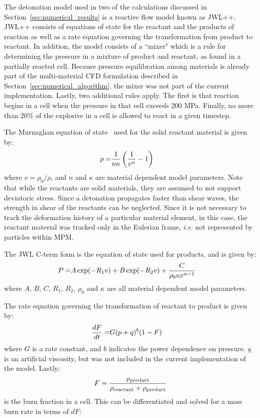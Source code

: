 The detonation model used in two of the calculations discussed in 
Section~\ref{sec:numerical_results} is a reactive flow model known as 
JWL++\cite{JWLpp}.  JWL++ consists of equations of state for the
reactant and the products of reaction as well as a rate equation governing 
the transformation from product to reactant.  In addition, the model consists 
of a ``mixer" which is a rule for determining the pressure in a mixture of 
product and reactant, as found in a partially reacted cell.  Because pressure 
equilibration among materials is already part of the  multi-material CFD 
formulation described in Section~\ref{sec:numerical_algorithm}, the mixer was 
not part of the current implementation.  Lastly, two additional rules 
apply.  The first is that reaction begins in a cell when the pressure in that
cell exceeds 200 MPa.  Finally, no more than 20\% of the explosive in a cell 
is allowed to react in a given timestep.

The Murnaghan equation of state~\cite{Murnaghan1944} used for the solid reactant 
material is given by:
\begin{eqnarray}
p=&{1\over n \kappa}\left({1\over v^n}-1\right)&
\label{Murnaghan}
\end{eqnarray}
where $v=\rho_0/\rho$, and $n$ and $\kappa$ are material dependent model 
parameters.  Note that while the reactants are solid materials, they are 
assumed to not support deviatoric stress.  Since a detonation propagates 
faster than shear waves, the strength in shear of the reactants can be 
neglected.  Since it is not necessary to track the deformation history 
of a particular material element, in this case, the reactant material was 
tracked only in the Eulerian frame, \textit{i.e.} not represented by 
particles within MPM.

The JWL C-term form is the equation of state used for products, and is 
given by:
\begin{eqnarray}
P=&A \exp(-R_1 v) + B \exp(-R_2 v) + {C\over {\rho_0 \kappa v^{n-1}}}&
\label{JWLC}
\end{eqnarray}
where $A$, $B$, $C$, $R_1$, $R_2$, $\rho_0$ and $\kappa$ are all 
material dependent model parameters.

The rate equation governing the transformation of reactant to product is 
given by:
\begin{eqnarray}
{dF \over dt}=&G(p+q)^b(1-F)
\label{JWL++rate}
\end{eqnarray}
where $G$ is a rate constant, and 
$b$ indicates the power dependence on pressure.  $q$ is an artificial 
viscosity, but was not included in the current implementation of
the model.  Lastly:
\begin{eqnarray}
F={{\rho_{\text{product}}}\over{\rho_{\ensuremath{\text{reactant}}}+\rho_{\ensuremath{\text{product}}}}}
\end{eqnarray}
is the burn fraction in a cell.  This can be differentiated and solved for 
a mass burn rate in terms of $dF$:

